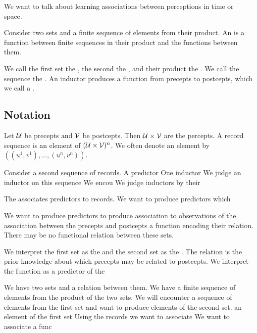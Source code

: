 
\sbasic






\sstart
{}


We want to talk about learning
associations between perceptions
in time or space.


Consider two sets and
a finite sequence of elements from
their product.
An  is a function
between
finite sequences in their product
and the functions between them.

We call the first set the
, the
second the ,
and their product the .
We call the sequence the .
An inductor produces a function from
precepts to postcepts, which we call
a .

\subsection{Notation}

Let $\mathcal{U}$ be precepts and $\mathcal{V}$ be postcepts.
Then $\mathcal{U} \times \mathcal{V}$ are the percepts.
A record sequence is an element of
$(\mathcal{U} \times \mathcal{V})^n$.
We often denote an element by
$((u^1,v^1), \dots, (u^n, v^n))$.

Consider a second sequence of records.
A predictor
One inductor
We judge an inductor on this sequence
We encou
We judge inductors by their

The  associates
predictors to records.
We want to produce predictors
which

We want to produce predictors
to produce
association to observations of the
association between the precepts
and postcepts a function encoding
their relation. There may be no
functional relation between these
sets.

We interpret the first set
as the 
and the second set as the
. The relation
is the prior knowledge about
which precepts may be related to
postcepts.
We interpret the function as a
predictor of the



We have two sets and a relation
between them.
We have a finite sequence of
elements from the product of
the two sets.
We will encounter a sequence of
elements from the first set
and want to produce elements of
the second set.
an element
of the first set
Using the records we want to
associate
We want to associate a func

